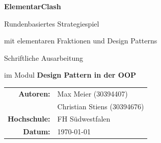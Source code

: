 \documentclass[a4paper,12pt]{article}
\begin{document}

\begin{titlepage}
    \centering
    \vspace*{2cm}

    {\Huge\bfseries ElementarClash\par}
    \vspace{0.5cm}
    {\Large Rundenbasiertes Strategiespiel\par}
    \vspace{0.3cm}
    {\large mit elementaren Fraktionen und Design Patterns\par}

    \vspace{2cm}

    {\large Schriftliche Ausarbeitung\par}
    \vspace{0.3cm}
    {\large im Modul \textbf{Design Pattern in der OOP}\par}

    \vspace{2cm}

    \begin{tabular}{rl}
        \textbf{Autoren:}    & Max Meier (30394407) \\
                             & Christian Stiens (30394676) \\
        \textbf{Hochschule:} & FH Südwestfalen \\
        \textbf{Datum:}      & \today \\
    \end{tabular}

    \vfill
\end{titlepage}

\clearpage
{}
\tableofcontents
\newpage

\newpage

\newpage

\newpage

\newpage

\newpage

\newpage

\end{document}

